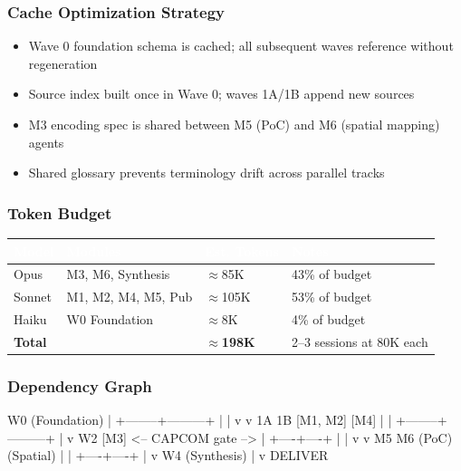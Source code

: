 \documentclass[11pt,letterpaper]{article}
\newcommand{\tableheader}[1]{\textbf{\sffamily\textcolor{white}{#1}}}
\begin{document}
\subsubsection{Cache Optimization Strategy}
\begin{itemize}[leftmargin=1.5em]
  \item Wave 0 foundation schema is cached; all subsequent waves reference without regeneration
  \item Source index built once in Wave 0; waves 1A/1B append new sources
  \item M3 encoding spec is shared between M5 (PoC) and M6 (spatial mapping) agents
  \item Shared glossary prevents terminology drift across parallel tracks
\end{itemize}

\subsubsection{Token Budget}

\begin{center}
\begin{tabularx}{\textwidth}{L{3cm}L{2cm}L{2.5cm}X}
\toprule
{}
\tableheader{Model} & \tableheader{Modules} & \tableheader{Est. Tokens} & \tableheader{Notes} \\
\midrule
Opus & M3, M6, Synthesis & $\approx$85K & 43\% of budget \\
Sonnet & M1, M2, M4, M5, Pub & $\approx$105K & 53\% of budget \\
Haiku & W0 Foundation & $\approx$8K & 4\% of budget \\
\midrule
\textbf{Total} & & \textbf{$\approx$198K} & 2--3 sessions at 80K each \\
\bottomrule
\end{tabularx}
\end{center}

\subsubsection{Dependency Graph}

\begin{asciibox}
W0 (Foundation)
  |
  +--------+---------+
  |                  |
  v                  v
 1A                 1B
[M1, M2]           [M4]
  |                  |
  +--------+---------+
           |
           v
          W2
         [M3]
   <-- CAPCOM gate -->
           |
      +----+----+
      |         |
      v         v
     M5        M6
   (PoC)   (Spatial)
      |         |
      +----+----+
           |
           v
       W4 (Synthesis)
           |
           v
        DELIVER
\end{asciibox}
\end{document}
